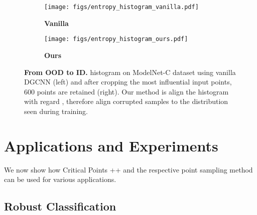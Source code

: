 \documentclass[10pt,twocolumn,letterpaper]{article}
\begin{document}
\begin{figure*}[ptbh!]
    \centering
    \captionsetup[subfigure]{justification=centering}
    \begin{subfigure}[t]{0.45\textwidth} \texttt{[image: figs/entropy\_histogram\_vanilla.pdf]}
\caption{{\bf Vanilla}}
        \label{subfig:entropy_histogram_vanilla}
    \end{subfigure}
    \begin{subfigure}[t]{0.45\textwidth} \texttt{[image: figs/entropy\_histogram\_ours.pdf]}
\caption{{\bf Ours} }    
        \label{subfig:entropy_histogram_ours}
    \end{subfigure}
    \caption{\textbf{From OOD to ID.}  histogram on ModelNet-C dataset using vanilla DGCNN (left) and after cropping the most influential input points, 600 points are retained (right). Our method is align the histogram with regard , therefore align corrupted samples to the distribution seen during training.
    }
    \label{fig:entropy_histogram}
\end{figure*}

\section{Applications and Experiments}


We now show how Critical Points ++ and the respective point sampling method can be used for various applications.

\subsection{Robust Classification}
\end{document}
